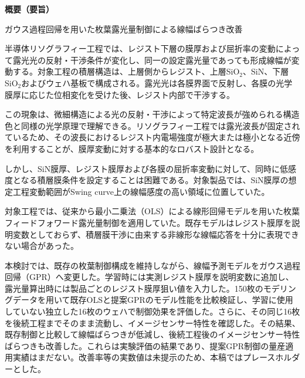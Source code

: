 \documentclass[11pt,a4paper]{ltjsarticle}
\begin{document}
\thispagestyle{empty}

\begin{center}
  {\Large\bfseries 概要（要旨）}\par
  \vspace{1.5\baselineskip}
  {\large ガウス過程回帰を用いた枚葉露光量制御による線幅ばらつき改善}
\end{center}

\vspace{1.5\baselineskip}

半導体リソグラフィー工程では、レジスト下層の膜厚および屈折率の変動によって露光光の反射・干渉条件が変化し、同一の設定露光量であっても形成線幅が変動する。対象工程の積層構造は、上層側からレジスト、上層SiO$_2$、SiN、下層SiO$_2$およびウェハ基板で構成される。露光光は各膜界面で反射し、各膜の光学膜厚に応じた位相変化を受けた後、レジスト内部で干渉する。

この現象は、微細構造による光の反射・干渉によって特定波長が強められる構造色と同様の光学原理で理解できる。リソグラフィー工程では露光波長が固定されているため、その波長におけるレジスト内電場強度が極大または極小となる近傍を利用することが、膜厚変動に対する基本的なロバスト設計となる。

しかし、SiN膜厚、レジスト膜厚および各膜の屈折率変動に対して、同時に低感度となる積層膜条件を設定することは困難である。対象製品では、SiN膜厚の想定工程変動範囲がSwing curve上の線幅感度の高い領域に位置していた。

対象工程では、従来から最小二乗法（OLS）による線形回帰モデルを用いた枚葉フィードフォワード露光量制御を適用していた。既存モデルはレジスト膜厚を説明変数としておらず、積層膜干渉に由来する非線形な線幅応答を十分に表現できない場合があった。

本検討では、既存の枚葉制御構成を維持しながら、線幅予測モデルをガウス過程回帰（GPR）へ変更した。学習時には実測レジスト膜厚を説明変数に追加し、露光量算出時には製品ごとのレジスト膜厚狙い値を入力した。150枚のモデリングデータを用いて既存OLSと提案GPRのモデル性能を比較検証し、学習に使用していない独立した16枚のウェハで制御効果を評価した。さらに、その同じ16枚を後続工程までそのまま流動し、イメージセンサー特性を確認した。その結果、既存制御と比較して線幅ばらつきが低減し、後続工程後のイメージセンサー特性ばらつきも改善した。これらは実験評価の結果であり、提案GPR制御の量産適用実績はまだない。改善率等の実数値は未提示のため、本稿ではプレースホルダーとした。
\end{document}
